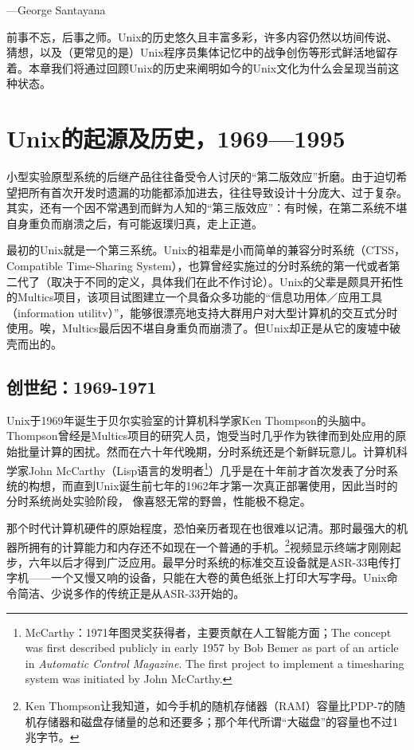\documentclass[11pt,oneside]{book}
\begin{document}
\begin{common-format}
\begin{flushright}
\begin{notecard}[red!30]
{\hfill —George Santayana}
\end{notecard}
\end{flushright}

前事不忘，后事之师。Unix的历史悠久且丰富多彩，许多内容仍然以坊间传说、猜想，以及（更常见的是）Unix程序员集体记忆中的战争创伤等形式鲜活地留存着。本章我们将通过回顾Unix的历史来阐明如今的Unix文化为什么会呈现当前这种状态。

\section{Unix的起源及历史，1969—1995}
小型实验原型系统的后继产品往往备受令人讨厌的“第二版效应”折磨。由于迫切希望把所有首次开发时遗漏的功能都添加进去，往往导致设计十分庞大、过于复杂。其实，还有一个因不常遇到而鲜为人知的“第三版效应”：有时候，在第二系统不堪自身重负而崩溃之后，有可能返璞归真，走上正道。

最初的Unix就是一个第三系统。Unix的祖辈是小而简单的兼容分时系统（CTSS，Compatible Time-Sharing System），也算曾经实施过的分时系统的第一代或者第二代了（取决于不同的定义，具体我们在此不作讨论）。Unix的父辈是颇具开拓性的Multics项目，该项目试图建立一个具备众多功能的“信息功用体／应用工具（information utilitv）”，能够很漂亮地支持大群用户对大型计算机的交互式分时使用。唉，Multics最后因不堪自身重负而崩溃了。但Unix却正是从它的废墟中破壳而出的。

\subsection{创世纪：1969-1971}
Unix于1969年诞生于贝尔实验室的计算机科学家Ken Thompson的头脑中。Thompson曾经是Multics项目的研究人员，饱受当时几乎作为铁律而到处应用的原始批量计算的困扰。然而在六十年代晚期，分时系统还是个新鲜玩意儿。计算机科学家John McCarthy（Lisp语言的发明者\footnote{McCarthy：1971年图灵奖获得者，主要贡献在人工智能方面；The concept was first described publicly in early 1957 by Bob Bemer as part of an article in \textit{Automatic Control Magazine}.  The first project to implement a timesharing system was initiated by John McCarthy. }）几乎是在十年前才首次发表了分时系统的构想，而直到Unix诞生前七年的1962年才第一次真正部署使用，因此当时的分时系统尚处实验阶段，
像喜怒无常的野兽，性能极不稳定。

那个时代计算机硬件的原始程度，恐怕亲历者现在也很难以记清。那时最强大的机器所拥有的计算能力和内存还不如现在一个普通的手机。\footnote{Ken Thompson让我知道，如今手机的随机存储器（RAM）容量比PDP-7的随机存储器和磁盘存储量的总和还要多；那个年代所谓“大磁盘”的容量也不过1兆字节。}视频显示终端才刚刚起步，六年以后才得到广泛应用。最早分时系统的标准交互设备就是ASR-33电传打字机——一个又慢又响的设备，只能在大卷的黄色纸张上打印大写字母。Unix命令简洁、少说多作的传统正是从ASR-33开始的。


\end{common-format}
\end{document}
